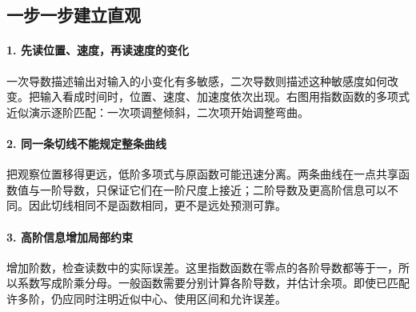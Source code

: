 \subsection*{一步一步建立直观}

\paragraph{1. 先读位置、速度，再读速度的变化}

一次导数描述输出对输入的小变化有多敏感，二次导数则描述这种敏感度如何改变。把输入看成时间时，位置、速度、加速度依次出现。右图用指数函数的多项式近似演示逐阶匹配：一次项调整倾斜，二次项开始调整弯曲。



\paragraph{2. 同一条切线不能规定整条曲线}

把观察位置移得更远，低阶多项式与原函数可能迅速分离。两条曲线在一点共享函数值与一阶导数，只保证它们在一阶尺度上接近；二阶导数及更高阶信息可以不同。因此切线相同不是函数相同，更不是远处预测可靠。



\paragraph{3. 高阶信息增加局部约束}

增加阶数，检查读数中的实际误差。这里指数函数在零点的各阶导数都等于一，所以系数写成阶乘分母。一般函数需要分别计算各阶导数，并估计余项。即使已匹配许多阶，仍应同时注明近似中心、使用区间和允许误差。

